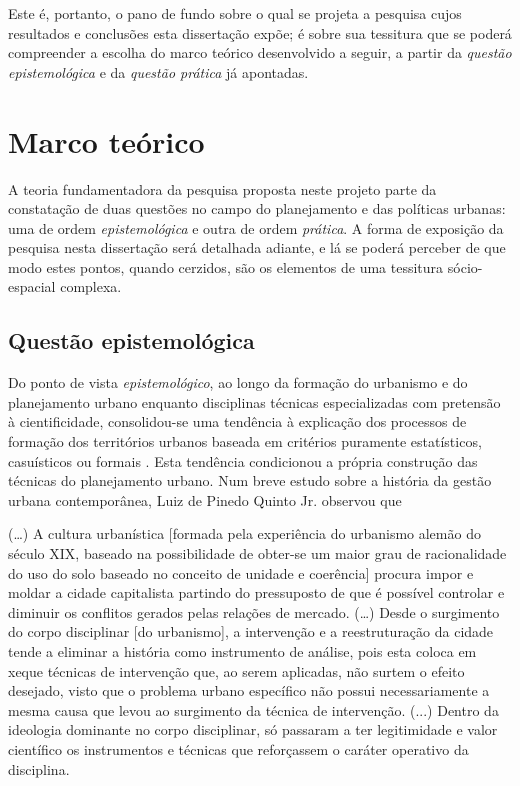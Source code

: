 Este é, portanto, o pano de fundo sobre o qual se projeta a pesquisa cujos resultados e conclusões esta dissertação expõe; é sobre sua tessitura que se poderá compreender a escolha do marco teórico desenvolvido a seguir, a partir da \textit{questão epistemológica} e da \textit{questão prática} já apontadas.

\section{Marco teórico}\label{sec:marcteor}

A teoria fundamentadora da pesquisa proposta neste projeto parte da constatação de duas questões no campo do planejamento e das políticas urbanas: uma de ordem \textit{epistemológica} e outra de ordem \textit{prática}. A forma de exposição da pesquisa nesta dissertação será detalhada adiante, e lá se poderá perceber de que modo estes pontos, quando cerzidos, são os elementos de uma tessitura sócio-espacial complexa.

\subsection{Questão epistemológica}
\label{subsec:questepist}

Do ponto de vista \textit{epistemológico}, ao longo da formação do urbanismo e do planejamento urbano enquanto disciplinas técnicas especializadas com pretensão à cientificidade, consolidou-se uma tendência à explicação dos processos de formação dos territórios urbanos baseada em critérios puramente estatísticos, casuísticos ou formais \cite{benevolo_historia_1983, mumford_cidade_1998, hall_cidades_2007}. Esta tendência condicionou a própria construção das técnicas do planejamento urbano. Num breve estudo sobre a história da gestão urbana contemporânea, Luiz de Pinedo Quinto Jr. observou que 

\begin{citacao}
(…) A cultura urbanística [formada pela experiência do urbanismo alemão do século XIX, baseado na possibilidade de obter-se um maior grau de racionalidade do uso do solo baseado no conceito de unidade e coerência] procura impor e moldar a cidade capitalista partindo do pressuposto de que é possível controlar e diminuir os conflitos gerados pelas relações de mercado. (…) Desde o surgimento do corpo disciplinar [do urbanismo], a intervenção e a reestruturação da cidade tende a eliminar a história como instrumento de análise, pois esta coloca em xeque técnicas de intervenção que, ao serem aplicadas, não surtem o efeito desejado, visto que o problema urbano específico não possui necessariamente a mesma causa que levou ao surgimento da técnica de intervenção. (...) Dentro da ideologia dominante no corpo disciplinar, só passaram a ter legitimidade e valor científico os instrumentos e técnicas que reforçassem o caráter operativo da disciplina. \cite{QUINTOJR1990}
\end{citacao}

